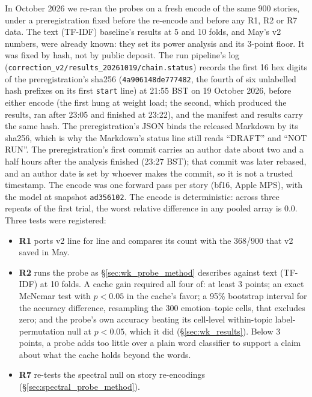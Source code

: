 In October 2026 we re-ran the probes on a fresh encode of the same 900 stories, under a preregistration fixed before the re-encode and before any R1, R2 or R7 data. The text (TF-IDF) baseline's results at 5 and 10 folds, and May's v2 numbers, were already known: they set its power analysis and its 3-point floor. It was fixed by hash, not by public deposit. The run pipeline's log (\texttt{correction\_v2/results\_20261019/chain.status}) records the first 16 hex digits of the preregistration's sha256 (\texttt{4a906148de777482}, the fourth of six unlabelled hash prefixes on its first \texttt{start} line) at 21:55 BST on 19 October 2026, before either encode (the first hung at weight load; the second, which produced the results, ran after 23:05 and finished at 23:22), and the manifest and results carry the same hash. The preregistration's JSON binds the released Markdown by its sha256, which is why the Markdown's status line still reads ``DRAFT'' and ``NOT RUN''. The preregistration's first commit carries an author date about two and a half hours after the analysis finished (23:27 BST); that commit was later rebased, and an author date is set by whoever makes the commit, so it is not a trusted timestamp. The encode was one forward pass per story (bf16, Apple MPS), with the model at snapshot \texttt{ad356102}. The encode is deterministic: across three repeats of the first trial, the worst relative difference in any pooled array is 0.0. Three tests were registered:
\begin{itemize}[nosep]
    \item \textbf{R1} ports v2 line for line and compares its count with the 368/900 that v2 saved in May.
    \item \textbf{R2} runs the probe as \S\ref{sec:wk_probe_method} describes against text (TF-IDF) at 10 folds. A cache gain required all four of: at least 3 points; an exact McNemar test with $p < 0.05$ in the cache's favor; a 95\% bootstrap interval for the accuracy difference, resampling the 300 emotion--topic cells, that excludes zero; and the probe's own accuracy beating its cell-level within-topic label-permutation null at $p < 0.05$, which it did (\S\ref{sec:wk_results}). Below 3 points, a probe adds too little over a plain word classifier to support a claim about what the cache holds beyond the words.
    \item \textbf{R7} re-tests the spectral null on story re-encodings (\S\ref{sec:spectral_probe_method}).
\end{itemize}
